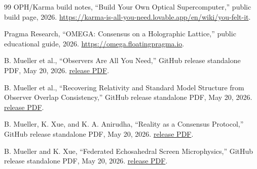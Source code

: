 \documentclass[11pt]{article}
\theoremstyle{definition}
\theoremstyle{remark}
\newcommand{\OPHPaperReleaseID}{standalone}
\newcommand{\OPHPaperReleaseDate}{May 20, 2026}
\begin{document}
\begin{thebibliography}{99}
OPH/Karma build notes,
``Build Your Own Optical Supercomputer,''
public build page, 2026.
\url{https://karma-is-all-you-need.lovable.app/en/wiki/you-felt-it}.

Pragma Research,
``OMEGA: Consensus on a Holographic Lattice,''
public educational guide, 2026.
\url{https://omega.floatingpragma.io}.

B. Mueller et al.,
``Observers Are All You Need,''
GitHub release \OPHPaperReleaseID{} PDF, \OPHPaperReleaseDate.
\href{https://github.com/FloatingPragma/observer-patch-holography/releases/download/\OPHPaperReleaseID/observers_are_all_you_need.pdf}{release PDF}.

B. Mueller et al.,
``Recovering Relativity and Standard Model Structure from Observer Overlap
Consistency,''
GitHub release \OPHPaperReleaseID{} PDF, \OPHPaperReleaseDate.
\href{https://github.com/FloatingPragma/observer-patch-holography/releases/download/\OPHPaperReleaseID/recovering_relativity_and_standard_model_structure_from_observer_overlap_consistency_compact.pdf}{release PDF}.

B. Mueller, K. Xue, and K. A. Anirudha,
``Reality as a Consensus Protocol,''
GitHub release \OPHPaperReleaseID{} PDF, \OPHPaperReleaseDate.
\href{https://github.com/FloatingPragma/observer-patch-holography/releases/download/\OPHPaperReleaseID/reality_as_consensus_protocol.pdf}{release PDF}.

B. Mueller and K. Xue,
``Federated Echosahedral Screen Microphysics,''
GitHub release \OPHPaperReleaseID{} PDF, \OPHPaperReleaseDate.
\href{https://github.com/FloatingPragma/observer-patch-holography/releases/download/\OPHPaperReleaseID/screen_microphysics_and_observer_synchronization.pdf}{release PDF}.

\end{thebibliography}
\end{document}
